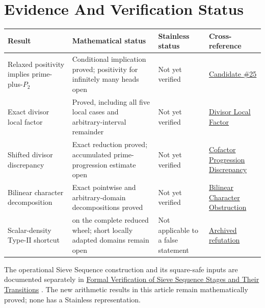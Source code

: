 \section{Evidence And Verification Status}

\begin{longtable}{@{}>{\raggedright\arraybackslash}p{}>{\raggedright\arraybackslash}p{}>{\raggedright\arraybackslash}p{}>{\raggedright\arraybackslash}p{}@{}}
\toprule
Result & Mathematical status & Stainless status & Cross-reference \\
\midrule
Relaxed positivity implies prime-plus-$P_2$ & Conditional implication proved; positivity for infinitely many heads open & Not yet verified & \href{https://github.com/thiagomata/prime-numbers/blob/master/candidates/chen-type-almost-prime-survivor.md}{Candidate \#25} \\
Exact divisor local factor & Proved, including all five local cases and arbitrary-interval remainder & Not yet verified & \href{https://github.com/thiagomata/prime-numbers/blob/master/properties/sieve-sequence/relaxed-almost-prime-divisor-local-factor.md}{Divisor Local Factor} \\
Shifted divisor discrepancy & Exact reduction proved; accumulated prime-progression estimate open & Not yet verified & \href{https://github.com/thiagomata/prime-numbers/blob/master/properties/sieve-sequence/relaxed-cofactor-divisor-sum-is-prime-progression-discrepancy.md}{Cofactor Progression Discrepancy} \\
Bilinear character decomposition & Exact pointwise and arbitrary-domain decompositions proved & Not yet verified & \href{https://github.com/thiagomata/prime-numbers/blob/master/properties/sieve-sequence/relaxed-almost-prime-bilinear-character-obstruction.md}{Bilinear Character Obstruction} \\
Scalar-density Type-II shortcut & [Refuted] on the complete reduced wheel; short locally adapted domains remain open & Not applicable to a false statement & \href{https://github.com/thiagomata/prime-numbers/blob/master/candidates/refuted/relaxed-weight-scalar-density-type-ii.md}{Archived refutation} \\
\bottomrule
\end{longtable}

The operational Sieve Sequence construction and its square-safe inputs are
documented separately in \href{https://github.com/thiagomata/prime-numbers/blob/master/articles/chapter6/sieve-sequence.md}{Formal Verification of Sieve Sequence Stages and
Their Transitions} \cite{sievesequence2026}. The new arithmetic results
in this article remain mathematically proved; none has a Stainless
representation.
